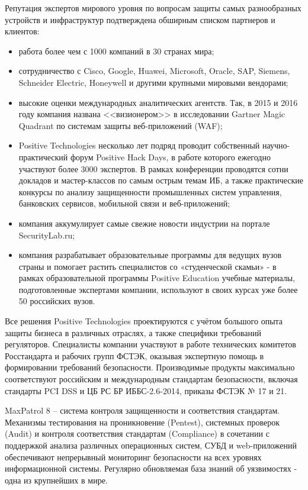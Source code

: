 Репутация экспертов мирового уровня по вопросам защиты самых разнообразных устройств и инфраструктур подтверждена обширным списком партнеров и клиентов:
\begin{itemize}
    \item работа более чем с 1000 компаний в 30 странах мира;
    \item сотрудничество с Cisco, Google, Huawei, Microsoft, Oracle, SAP, Siemens, Schneider Electric, Honeywell и другими крупными мировыми вендорами;
    \item высокие оценки международных аналитических агентств. Так, в 2015 и 2016 году компания названа <<визионером>> в исследовании Gartner Magic Quadrant по системам защиты веб-приложений (WAF);
    \item Positive Technologies несколько лет подряд проводит собственный научно- практический форум Positive Hack Days, в работе которого ежегодно участвуют более 3000 экспертов. В рамках конференции проводятся сотни докладов и мастер-классов по самым острым темам ИБ, а также практические конкурсы по анализу защищенности промышленных систем управления, банковских сервисов, мобильной связи и веб-приложений;
    \item компания аккумулирует самые свежие новости индустрии на портале SecurityLab.ru;
    \item компания разрабатывает образовательные программы для ведущих вузов страны и помогает растить специалистов со «студенческой скамьи» - в рамках образовательной программы Positive Education учебные материалы, подготовленные экспертами компании, используют в своих курсах уже более 50 российских вузов.
\end{itemize}

Все решения Positive Technologies проектируются с учётом большого опыта защиты бизнеса в различных отраслях, а также специфики требований регуляторов. Специалисты компании участвуют в работе технических комитетов Росстандарта и рабочих групп ФСТЭК, оказывая экспертную помощь в формировании требований безопасности. Производимые продукты максимально соответствуют российским и международным стандартам безопасности, включая стандарты PCI DSS и ЦБ РС БР ИББС-2.6-2014, приказы ФСТЭК № 17 и 21.\par

MaxPatrol 8 -- система контроля защищенности и соответствия стандартам. Механизмы тестирования на проникновение (Pentest), системных проверок (Audit) и контроля соответствия стандартам (Compliance) в сочетании с поддержкой анализа различных операционных систем, СУБД и web-приложений обеспечивают непрерывный мониторинг безопасности на всех уровнях информационной системы. Регулярно обновляемая база знаний об уязвимостях - одна из крупнейших в мире.\par

